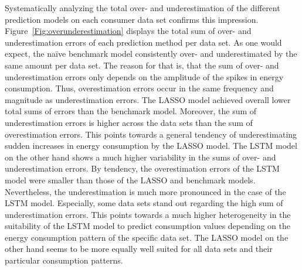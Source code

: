Systematically analyzing the total over- and underestimation of the different prediction models on each consumer data set confirms this impression. Figure~\ref{Fig:overunderestimation} displays the total sum of over- and underestimation errors of each prediction method per data set. As one would expect, the na\"ive benchmark model consistently over- and underestimated by the same amount per data set. The reason for that is, that the sum of over- and underestimation errors only depends on the amplitude of the spikes in energy consumption. Thus, overestimation errors occur in the same frequency and magnitude as underestimation errors. The LASSO model achieved overall lower total sums of errors than the benchmark model. Moreover, the sum of underestimation errors is higher across the data sets than the sum of overestimation errors. This points towards a general tendency of underestimating sudden increases in energy consumption by the LASSO model. The LSTM model on the other hand shows a much higher variability in the sums of over- and underestimation errors. By tendency, the overestimation errors of the LSTM model were smaller than those of the LASSO and benchmark models. Nevertheless, the underestimation is much more pronounced in the case of the LSTM model. Especially, some data sets stand out regarding the high sum of underestimation errors. This points towards a much higher heterogeneity in the suitability of the LSTM model to predict consumption values depending on the energy consumption pattern of the specific data set. The LASSO model on the other hand seems to be more equally well suited for all data sets and their particular consumption patterns.
%
